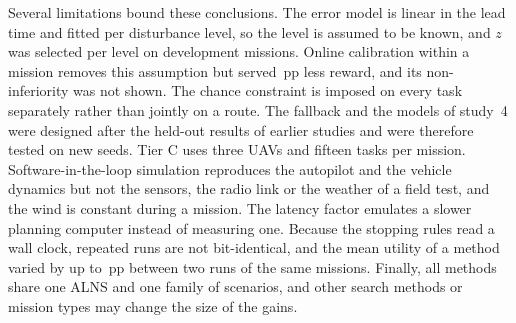 
Several limitations bound these conclusions. The error model is linear in the lead time and fitted per disturbance
level, so the level is assumed to be known, and $z$ was selected per level on development missions. Online calibration
within a mission removes this assumption but served \,pp less reward, and its non-inferiority was not
shown. The chance constraint is imposed on every task separately rather than jointly on a route. The fallback and the
models of study~4 were designed after the held-out results of earlier studies and were therefore tested on new seeds.
Tier C uses three UAVs and fifteen tasks per mission. Software-in-the-loop simulation reproduces the autopilot and the
vehicle dynamics but not the sensors, the radio link or the weather of a field test, and the wind is constant during a
mission. The latency factor emulates a slower planning computer instead of measuring one. Because the stopping rules
read a wall clock, repeated runs are not bit-identical, and the mean utility of a method varied by up to
\,pp between two runs of the same missions. Finally, all methods share one ALNS and one family of
scenarios, and other search methods or mission types may change the size of the gains.
